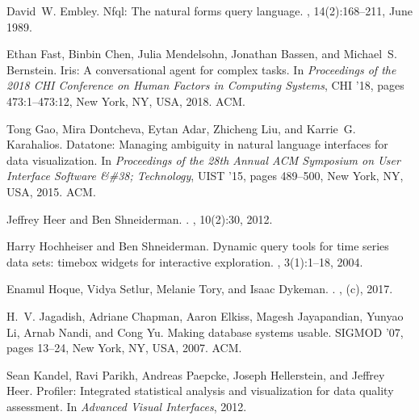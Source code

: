 \documentclass[11pt]{article}
\begin{document}
{\begin{thebibliography}{}
David~W. Embley.
\newblock Nfql: The natural forms query language.
, 14(2):168--211,
  June 1989.

Ethan Fast, Binbin Chen, Julia Mendelsohn, Jonathan Bassen, and Michael~S.
  Bernstein.
\newblock Iris: A conversational agent for complex tasks.
\newblock In {\em Proceedings of the 2018 CHI Conference on Human Factors in
  Computing Systems}, CHI '18, pages 473:1--473:12, New York, NY, USA, 2018.
  ACM.

Tong Gao, Mira Dontcheva, Eytan Adar, Zhicheng Liu, and Karrie~G. Karahalios.
\newblock Datatone: Managing ambiguity in natural language interfaces for data
  visualization.
\newblock In {\em Proceedings of the 28th Annual ACM Symposium on User
  Interface Software \&\#38; Technology}, UIST '15, pages 489--500, New York,
  NY, USA, 2015. ACM.

Jeffrey Heer and Ben Shneiderman.
.
, 10(2):30, 2012.

Harry Hochheiser and Ben Shneiderman.
\newblock Dynamic query tools for time series data sets: timebox widgets for
  interactive exploration.
, 3(1):1--18, 2004.

Enamul Hoque, Vidya Setlur, Melanie Tory, and Isaac Dykeman.
.
, (c),
  2017.

H.~V. Jagadish, Adriane Chapman, Aaron Elkiss, Magesh Jayapandian, Yunyao Li,
  Arnab Nandi, and Cong Yu.
\newblock Making database systems usable.
\newblock SIGMOD '07, pages 13--24, New York, NY, USA, 2007. ACM.

Sean Kandel, Ravi Parikh, Andreas Paepcke, Joseph Hellerstein, and Jeffrey
  Heer.
\newblock Profiler: Integrated statistical analysis and visualization for data
  quality assessment.
\newblock In {\em Advanced Visual Interfaces}, 2012.


\end{thebibliography}}
\end{document}
